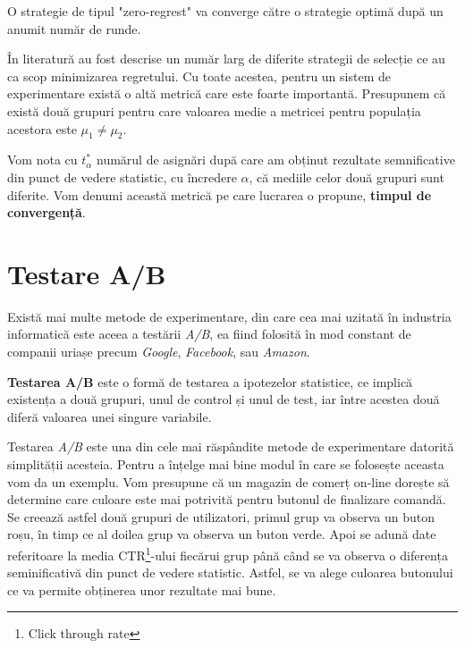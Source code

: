 \begin{remark}
	O strategie de tipul "zero-regrest" va converge către o strategie optimă după un anumit număr de runde.
\end{remark}

În literatură au fost descrise un număr larg de diferite strategii de selecție ce au ca scop minimizarea regretului. Cu toate acestea, pentru un sistem de experimentare există o altă metrică care este foarte importantă. Presupunem că există două grupuri pentru care valoarea medie a metricei pentru populația acestora este $\mu_1 \neq \mu_2$.

\begin{definition}
	Vom nota cu $t_{\alpha}^*$ numărul de asignări după care am obținut rezultate semnificative din punct de vedere statistic, cu încredere $\alpha$, că mediile celor două grupuri sunt diferite. Vom denumi această metrică pe care lucrarea o propune, \textbf{timpul de convergență}.
\end{definition}

\section{Testare A/B}

Există mai multe metode de experimentare, din care cea mai uzitată în industria informatică este aceea a testării \textit{A/B}, ea fiind folosită în mod constant de companii uriașe precum \textit{Google}, \textit{Facebook}, sau \textit{Amazon}. 

\begin{definition}
	\textbf{Testarea A/B} este o formă de testarea a ipotezelor statistice, ce implică existența a două grupuri, unul de control și unul de test, iar între acestea două diferă valoarea unei singure variabile.
\end{definition}

Testarea \textit{A/B} este una din cele mai răspândite metode de experimentare datorită simplității acesteia. Pentru a înțelge mai bine modul în care se folosește aceasta vom da un exemplu. Vom presupune că un magazin de comerț on-line dorește să determine care culoare este mai potrivită pentru butonul de finalizare comandă. Se creează astfel două grupuri de utilizatori, primul grup va observa un buton roșu, în timp ce al doilea grup va observa un buton verde. Apoi se adună date referitoare la media CTR\footnote{Click through rate}-ului fiecărui grup până când se va observa o diferența seminificativă din punct de vedere statistic. Astfel, se va alege culoarea butonului ce va permite obținerea unor rezultate mai bune. 

